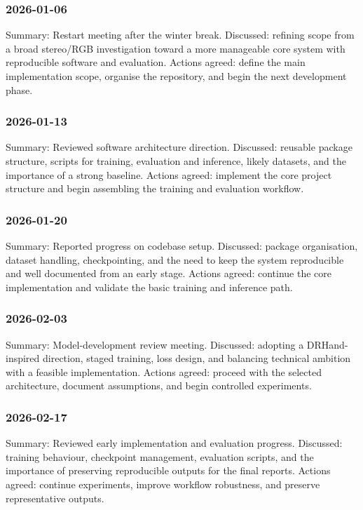 ﻿\documentclass[11pt,a4paper]{article}
\begin{document}
\subsubsection*{2026-01-06}

Summary: Restart meeting after the winter break.
Discussed: refining scope from a broad stereo/RGB investigation toward a more
manageable core system with reproducible software and evaluation.
Actions agreed: define the main implementation scope, organise the repository,
and begin the next development phase.

\subsubsection*{2026-01-13}

Summary: Reviewed software architecture direction.
Discussed: reusable package structure, scripts for training, evaluation and
inference, likely datasets, and the importance of a strong baseline.
Actions agreed: implement the core project structure and begin assembling the
training and evaluation workflow.

\subsubsection*{2026-01-20}

Summary: Reported progress on codebase setup.
Discussed: package organisation, dataset handling, checkpointing, and the need
to keep the system reproducible and well documented from an early stage.
Actions agreed: continue the core implementation and validate the basic
training and inference path.

\subsubsection*{2026-02-03}

Summary: Model-development review meeting.
Discussed: adopting a DRHand-inspired direction, staged training, loss design,
and balancing technical ambition with a feasible implementation.
Actions agreed: proceed with the selected architecture, document assumptions,
and begin controlled experiments.

\subsubsection*{2026-02-17}

Summary: Reviewed early implementation and evaluation progress.
Discussed: training behaviour, checkpoint management, evaluation scripts, and
the importance of preserving reproducible outputs for the final reports.
Actions agreed: continue experiments, improve workflow robustness, and preserve
representative outputs.
\end{document}

